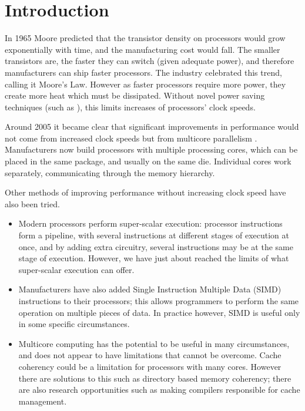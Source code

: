 %
%
\chapter{Introduction}
\setcounter{page}{1}
\label{chap:intro}


In 1965 Moore \citep{moore} predicted that the transistor 
density on processors would grow exponentially with time,
and the manufacturing cost would fall.
The smaller transistors are, the faster they can switch
(given adequate power),
and therefore manufacturers can ship faster processors.
The industry celebrated this trend,
calling it Moore's Law.
However as faster processors require more power,
they create more heat which must be dissipated.
Without novel power saving techniques
(such as \citet{intel-high-k}),
this limits increases of processors' clock speeds.

Around 2005 it became clear that significant improvements in performance
would not come from increased clock speeds but from multicore parallelism
\citep{free_lunch}.
Manufacturers now build processors with multiple processing cores,
which can be placed in the same package,
and usually on the same die.
Individual cores work separately, communicating through the memory
hierarchy.

Other methods of improving performance without increasing clock speed have
also been tried.

\begin{itemize}

\item
Modern processors perform super-scalar execution:
processor instructions form a pipeline,
with several instructions at different stages of execution at once,
and by adding extra circuitry, several instructions may be at the same stage
of execution.
However, we have just about reached the limits of what super-scalar
execution can offer.

\item
Manufacturers have also added Single Instruction Multiple Data (SIMD)
instructions to their processors;
this allows programmers to perform the same operation on multiple pieces of
data.
In practice however, SIMD is useful only in some specific circumstances.

\item
Multicore computing has the potential to be useful in many circumstances,
and does not appear to have limitations that cannot be overcome.
Cache coherency could be a limitation for processors with many cores.
However there are solutions to this such as directory based memory
coherency;
there are also research opportunities such as making compilers responsible
for cache management.

\end{itemize}

